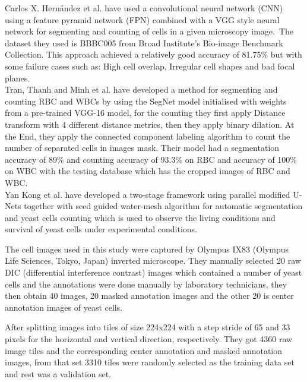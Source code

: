 \documentclass[conference]{IEEEtran}
\begin{document}
Carlos X. Hern{\'{a}}ndez et al. \cite{DBLP:journals/corr/abs-1802-10548} have used a convolutional neural network (CNN) using a feature pyramid network (FPN) combined with a VGG style neural network for segmenting and counting of cells in a given microscopy image.\
The dataset they used is BBBC005 \cite{ljosa2012annotated} from Broad Institute's Bio-image Benchmark Collection. This approach achieved a relatively good accuracy of 81.75\% but with some failure cases such as: High cell overlap, Irregular cell shapes and bad focal planes.\\

Tran, Thanh and Minh et al. \cite{tran2019blood} have developed a method for segmenting and counting RBC and WBCs by using the SegNet model initialised with weights from a pre-trained VGG-16 model, for the counting they first apply Distance transform with 4 different distance metrics, then they apply binary dilation. At the End, they apply the connected component labeling algorithm to count the number of separated cells in images mask. Their model had a segmentation accuracy of 89\% and counting accuracy of 93.3\% on RBC and accuracy of 100\% on WBC with the testing database which has the cropped images of RBC and WBC.\\

Yan Kong et al.\cite{Kong:20} have developed a two-stage framework using parallel modified U-Nets together with seed guided water-mesh algorithm for automatic segmentation and yeast cells counting which is used to observe the living conditions and survival of yeast cells under experimental conditions.\

The cell images used in this study were captured by Olympus IX83 (Olympus Life Sciences, Tokyo, Japan) inverted microscope. They manually selected 20 raw DIC (differential interference contrast) images which contained a number of yeast cells and the annotations were done manually by laboratory technicians, they then obtain 40 images, 20 masked annotation images and the other 20 is center annotation images of yeast cells.\

After splitting images into tiles of size 224x224 with a step stride of 65 and 33 pixels for the horizontal and vertical direction, respectively. They got 4360 raw image tiles and the corresponding center annotation and masked annotation images, from that set 3310 tiles were randomly selected as the training data set and rest was a validation set.
\end{document}
